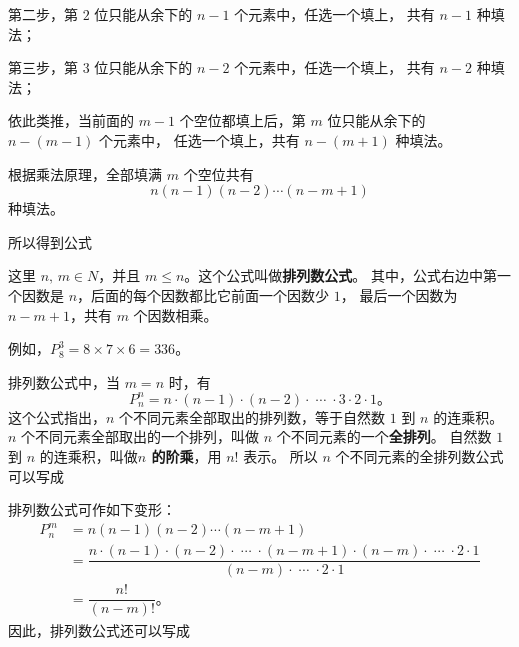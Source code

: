 第二步，第 $2$ 位只能从余下的 $n-1$ 个元素中，任选一个填上， 共有 $n-1$ 种填法；

第三步，第 $3$ 位只能从余下的 $n-2$ 个元素中，任选一个填上， 共有 $n-2$ 种填法；

依此类推，当前面的 $m-1$ 个空位都填上后，第 $m$ 位只能从余下的 $n - (m-1)$ 个元素中，
任选一个填上，共有 $n - (m+1)$ 种填法。

根据乘法原理，全部填满 $m$ 个空位共有
$$ n (n-1) (n-2) \cdots (n-m+1) $$
种填法。

所以得到公式
\begin{center}
\end{center}
这里 $n,\, m \in N$，并且 $m \leqslant n$。这个公式叫做\textbf{排列数公式}。
其中，公式右边中第一个因数是 $n$，后面的每个因数都比它前面一个因数少 $1$，
最后一个因数为 $n-m+1$，共有 $m$ 个因数相乘。

例如，$P_8^3 = 8 \times 7 \times 6 = 336$。

排列数公式中，当 $m=n$ 时，有
$$ P_n^n = n \cdot (n-1) \cdot (n-2) \cdot \; \cdots \; \cdot 3 \cdot 2 \cdot 1 \text{。} $$
这个公式指出，$n$ 个不同元素全部取出的排列数，等于自然数 $1$ 到 $n$ 的连乘积。
$n$ 个不同元素全部取出的一个排列，叫做 $n$ 个不同元素的一个\textbf{全排列}。
自然数 $1$ 到 $n$ 的连乘积，叫做\textbf{$n$ 的阶乘}，用 $n!$ 表示。
所以 $n$ 个不同元素的全排列数公式可以写成
\begin{center}
\end{center}

排列数公式可作如下变形：
$$\begin{aligned}
    P_n^m &= n (n-1) (n-2) \cdots (n-m+1) \\
        &= \dfrac{n \cdot (n-1) \cdot (n-2) \cdot \; \cdots \; \cdot (n-m+1) \cdot (n-m) \cdot \; \cdots \; \cdot 2 \cdot 1}{(n-m) \cdot \; \cdots \; \cdot 2 \cdot 1} \\
        &= \dfrac{n!}{(n-m)!} \text{。}
\end{aligned}$$
因此，排列数公式还可以写成
\begin{center}
\end{center}

